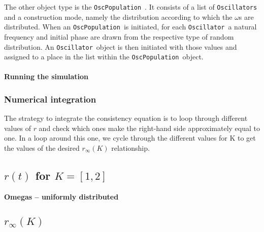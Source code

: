 \documentclass[10pt,a4paper]{article}
\newcommand{\osc}{\texttt{Oscillator}~}
\newcommand{\oscpop}{\texttt{OscPopulation}~}
\begin{document}
The other object type is the \oscpop. 
It consists of a list of \texttt{Oscillators} and a construction mode, namely the distribution according to which the $\omega$s are distributed.
When an \oscpop is initiated, for each \osc a natural frequency and initial phase are drawn from the respective type of random distribution. 
An \osc object is then initiated with those values and assigned to a place in the list within the \oscpop object.


\paragraph{Running the simulation}











\subsubsection{Numerical integration}


The strategy to integrate the consistency equation is to loop through different values of $r$ and check which ones make the right-hand side approximately equal to one. 
In a loop around this one, we cycle through the different values for K to get the values of the desired $r_\infty(K)$ relationship. 















\subsection{$r(t)$ for $K = [1, 2]$}












{\large\textbf{Omegas -- uniformly distributed}}
\subsection{$r_{\infty}(K)$}
\end{document}
